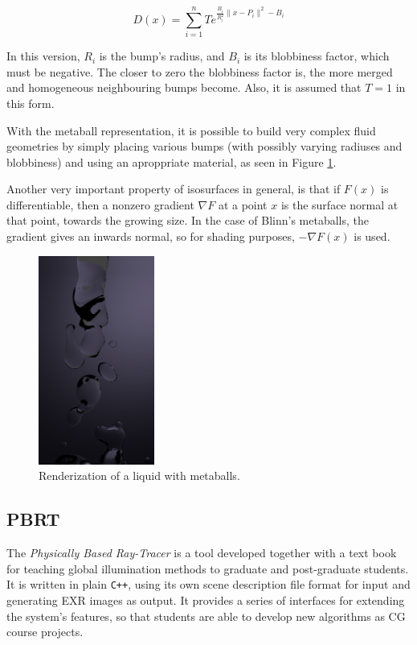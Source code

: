 \documentclass[conference]{acmsiggraph}
\begin{document}
\begin{equation}
  D(x) = \sum_{i=1}^{n} T e^{\frac{B_i}{R_i^2}\|x-P_i\|^2 - B_i}
\end{equation}

In this version, $R_i$ is the bump's radius, and $B_i$ is its blobbiness
factor, which must be negative. The closer to zero the blobbiness factor is,
the more merged and homogeneous neighbouring bumps become. Also, it is assumed
that $T=1$ in this form.

With the metaball representation, it is possible to build very complex fluid
geometries by simply placing various bumps (with possibly varying radiuses and
blobbiness) and using an aproppriate material, as seen in Figure
\ref{img:metaball-liquid}\footnotemark{}.

Another very important property of isosurfaces in general, is that if
$F(x)$ is differentiable, then a nonzero gradient $\nabla F$ at a point $x$ is
the surface normal at that point, towards the growing size. In the case of
Blinn's metaballs, the gradient gives an inwards normal, so for shading
purposes, $-\nabla F(x)$ is used.

\begin{figure}[ht]
  \centering
  \includegraphics[width=1.5in]{images/fluid.png}
  \caption{Renderization of a liquid with metaballs.}
  \label{img:metaball-liquid}
\end{figure}


\subsection{PBRT}

The \textit{Physically Based Ray-Tracer} is a tool developed together with a
text book \cite{Pharr:2010:PBR:1854996} for teaching global illumination methods
to graduate and post-graduate students. It is written in plain \texttt{C++},
using its own scene description file format for input and generating EXR images
\cite{EXR} as output. It provides a series of interfaces for extending the
system's features, so that students are able to develop new algorithms as CG
course projects.
\end{document}
